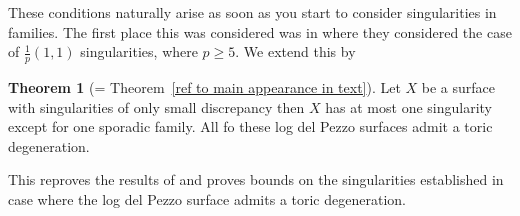 \documentclass[11pt]{amsart}
\theoremstyle{definition}
\newtheorem{thm}{Theorem}[section]
\theoremstyle{definition}
\theoremstyle{definition}
\theoremstyle{definition}
\theoremstyle{definition}
\theoremstyle{definition}
\theoremstyle{definition}
\begin{document}
These conditions naturally arise as soon as you start to consider singularities in families. The first place this was considered was in \cite{CP} where they considered the case of $\frac{1}{p}(1,1)$ singularities, where $p \geq 5$. We extend this by


\begin{thm}[= Theorem~\ref{ref to main appearance in text}]
Let $X$ be a surface with singularities of only small discrepancy then $X$ has at most one singularity except for one sporadic family. All fo these log del Pezzo surfaces admit a toric degeneration.
\end{thm}

This reproves the results of \cite{CP} and proves bounds on the singularities established in \cite{CH} case where the log del Pezzo surface admits a toric degeneration.
\end{document}
